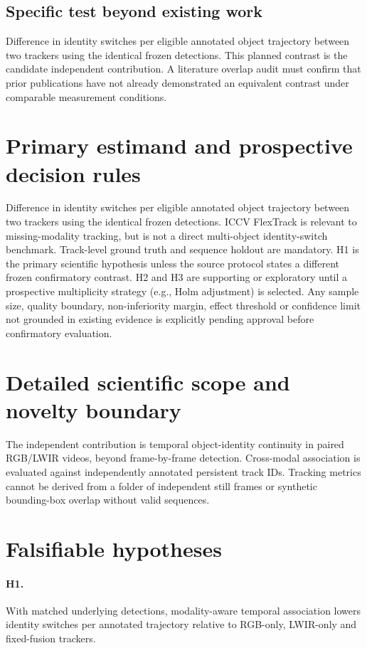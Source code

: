 \documentclass[11pt,a4paper]{article}
\begin{document}
\subsection{Specific test beyond existing work}
Difference in identity switches per eligible annotated object trajectory between two trackers using the identical frozen detections. This planned contrast is the candidate independent contribution. A literature overlap audit must confirm that prior publications have not already demonstrated an equivalent contrast under comparable measurement conditions.

\section{Primary estimand and prospective decision rules}
Difference in identity switches per eligible annotated object trajectory between two trackers using the identical frozen detections. ICCV FlexTrack is relevant to missing-modality tracking, but is not a direct multi-object identity-switch benchmark. Track-level ground truth and sequence holdout are mandatory. H1 is the primary scientific hypothesis unless the source protocol states a different frozen confirmatory contrast. H2 and H3 are supporting or exploratory until a prospective multiplicity strategy (e.g., Holm adjustment) is selected. Any sample size, quality boundary, non-inferiority margin, effect threshold or confidence limit not grounded in existing evidence is explicitly pending approval before confirmatory evaluation.

\section{Detailed scientific scope and novelty boundary}
The independent contribution is temporal object-identity continuity in paired RGB/LWIR videos, beyond frame-by-frame detection. Cross-modal association is evaluated against independently annotated persistent track IDs. Tracking metrics cannot be derived from a folder of independent still frames or synthetic bounding-box overlap without valid sequences.

\section{Falsifiable hypotheses}
\paragraph{H1.} With matched underlying detections, modality-aware temporal association lowers identity switches per annotated trajectory relative to RGB-only, LWIR-only and fixed-fusion trackers.
\end{document}

